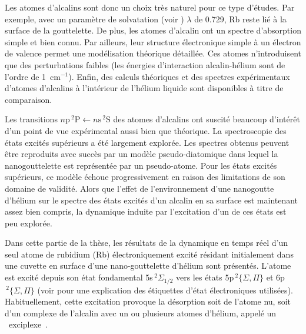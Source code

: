 		Les atomes d'alcalins sont donc un choix très naturel pour ce type d'études. 
		Par exemple, avec un paramètre de solvatation (voir )  $\lambda$ de 0.729\citep{Anc95}, Rb reste lié à la surface de la gouttelette. 
		De plus, les atomes d'alcalin ont un spectre d'absorption simple et bien connu. 
		Par ailleurs, leur structure électronique simple à un électron de valence permet une modélisation théorique détaillée. 
		Ces atomes n'introduisent que des perturbations faibles (les énergies d'interaction alcalin-hélium sont de l'ordre de 1~cm$^{-1}$\citep{Pat91}). 
		Enfin, des calculs théoriques\citep{Ancilotto1995-2,Kanorsky1994} et des spectres expérimentaux\citep{Tabbert1995,Takahashi1993,Beijersbergen1993} d'atomes d'alcalins à l'intérieur de l'hélium liquide sont disponibles à titre de comparaison.
		
		Les transitions $n\mathrm{p}\,^2\mathrm{P}\!\leftarrow\!n\mathrm{s}\,^2\mathrm{S}$  des atomes d'alcalins ont suscité beaucoup d'intérêt d'un point de vue expérimental aussi bien que théorique. 
		La spectroscopie des états excités supérieurs a été largement explorée\citep{Log11b,Log11a,Lackner2012,Lackner2013,The11,Fec12,Pif10,Lac11,Theisen2011,Lac13}.
		 Les spectres obtenus peuvent être reproduits avec succès par un modèle pseudo-diatomique dans lequel la nanogouttelette est représentée par un pseudo-atome.
		 Pour les états excités supérieurs, ce modèle échoue progressivement en raison des limitations de son domaine de validité\citep{Sti96,Bunermann2007}. 
		 Alors que l'effet de l'environnement d'une nanogoutte d'hélium sur le spectre des états excités d'un alcalin en sa surface est maintenant assez bien compris, la dynamique induite par l'excitation d'un de ces états est peu explorée.
		
		Dans cette partie de la thèse, les résultats de la dynamique en temps réel d'un seul atome de rubidium (Rb) électroniquement excité résidant initialement dans une cuvette en surface d'une nano-gouttelette d'hélium sont présentés. 
		L'atome est excité depuis son état fondamental 5s$\,^2\Sigma_{1/2}$ vers les états 5p$\,^2\{\Sigma,\Pi\}$ et 6p$\,^2\{\Sigma,\Pi\}$  (voir  pour une explication des étiquettes d'état électroniques utilisées). 
		Habituellement, cette excitation provoque la désorption soit de l'atome nu, soit  d'un complexe de l'alcalin avec un ou plusieurs atomes d'hélium, appelé un \guillemotleft~exciplexe~\guillemotright.	
	
